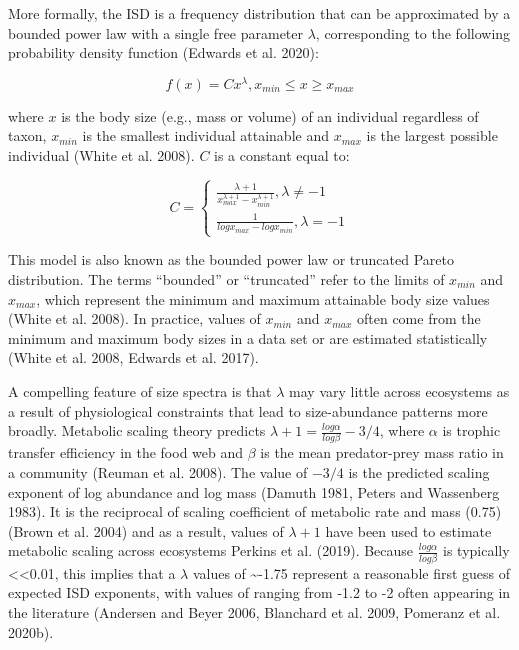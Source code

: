 \documentclass[
  12pt,
]{article}
\numberwithin{equation}
\begin{document}
More formally, the ISD is a frequency distribution that can be
approximated by a bounded power law with a single free parameter
\(\lambda\), corresponding to the following probability density function
(Edwards et al. 2020):

\[
f(x) = Cx^\lambda, x_{min} \le x \ge x_{max}
\]

where \(x\) is the body size (e.g., mass or volume) of an individual
regardless of taxon, \(x_{min}\) is the smallest individual attainable
and \(x_{max}\) is the largest possible individual (White et al. 2008).
\(C\) is a constant equal to:

\[
 C = \begin{cases}\frac{\lambda + 1}{{x_{max}^{\lambda+1}} - {x_{min}^{\lambda+1}}}, \lambda \neq-1 \\
\frac{1}{{logx_{max}} - {logx_{min}}}, \lambda = -1\end{cases}
\]

This model is also known as the bounded power law or truncated Pareto
distribution. The terms ``bounded'' or ``truncated'' refer to the limits
of \(x_{min}\) and \(x_{max}\), which represent the minimum and maximum
attainable body size values (White et al. 2008). In practice, values of
\(x_{min}\) and \(x_{max}\) often come from the minimum and maximum body
sizes in a data set or are estimated statistically (White et al. 2008,
Edwards et al. 2017).

A compelling feature of size spectra is that \(\lambda\) may vary little
across ecosystems as a result of physiological constraints that lead to
size-abundance patterns more broadly. Metabolic scaling theory predicts
\(\lambda + 1 = \frac{log\alpha}{log\beta} - 3/4\), where \(\alpha\) is
trophic transfer efficiency in the food web and \(\beta\) is the mean
predator-prey mass ratio in a community (Reuman et al. 2008). The value
of \(-3/4\) is the predicted scaling exponent of log abundance and log
mass (Damuth 1981, Peters and Wassenberg 1983). It is the reciprocal of
scaling coefficient of metabolic rate and mass (0.75) (Brown et al.
2004) and as a result, values of \(\lambda + 1\) have been used to
estimate metabolic scaling across ecosystems Perkins et al. (2019).
Because \(\frac{log\alpha}{log\beta}\) is typically
\textless\textless0.01, this implies that a \(\lambda\) values of
\textasciitilde-1.75 represent a reasonable first guess of expected ISD
exponents, with values of ranging from -1.2 to -2 often appearing in the
literature (Andersen and Beyer 2006, Blanchard et al. 2009, Pomeranz et
al. 2020b).
\end{document}
